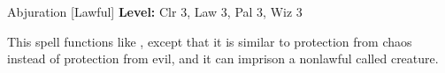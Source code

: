 {Abjuration [Lawful]}
{
	\textbf{Level:}
	Clr 3, Law 3, Pal 3, Wiz 3\\
}
{
	This spell functions like , except that it is similar to protection from chaos instead of protection from evil, and it can imprison a nonlawful called creature.

}
